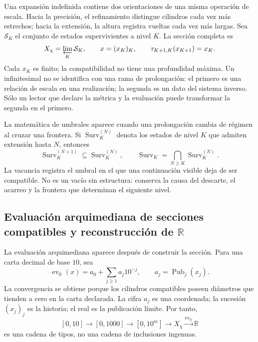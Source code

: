 Una expansión indefinida contiene dos orientaciones de una misma operación
de escala. Hacia la precisión, el refinamiento distingue cilindros cada vez
más estrechos; hacia la extensión, la altura registra vueltas cada vez más
largas. Sea \(\mathcal S_K\) el conjunto de estados supervivientes a nivel
\(K\). La sección completa es
\begin{equation}\label{p12-83-c0-s2:eq:amp-seccion-infinita}
 X_\chi=\varprojlim_K\mathcal S_K,
 \qquad
 x=(x_K)_K,
 \qquad \tau_{K+1,K}(x_{K+1})=x_K.
\end{equation}
Cada \(x_K\) es finito; la compatibilidad no tiene una profundidad máxima.
Un infinitesimal no se identifica con una rama de prolongación: el primero
es una relación de escala en una realización; la segunda es un dato del
sistema inverso. Sólo un lector que declare la métrica y la evaluación puede
transformar la segunda en el primero.

La matemática de umbrales aparece cuando una prolongación cambia de régimen
al cruzar una frontera. Si
\(\operatorname{Surv}_K^{(N)}\) denota los estados de nivel \(K\) que admiten
extensión hasta \(N\), entonces
\begin{equation}\label{p12-83-c0-s2:eq:amp-horizontes-supervivencia}
 \operatorname{Surv}_K^{(N+1)}\subseteq
 \operatorname{Surv}_K^{(N)},
 \qquad
 \operatorname{Surv}_K=\bigcap_{N\geq K}
 \operatorname{Surv}_K^{(N)}.
\end{equation}
La vacancia registra el umbral en el que una continuación visible deja de
ser compatible. No es un vacío sin estructura: conserva la causa del
descarte, el acarreo y la frontera que determinan el siguiente nivel.

\subsection{Evaluación arquimediana de secciones compatibles y reconstrucción de \(\mathbb R\)}

La evaluación arquimediana aparece después de construir la sección. Para
una carta decimal de base \(10\), sea
\begin{equation}\label{p12-83-c0-s2:eq:amp-evaluacion-arquimediana}
 \operatorname{ev}_{\mathbb R}(x)
 =a_0+\sum_{j\geq1}a_j10^{-j},
 \qquad a_j=\operatorname{Pub}_j(x_j).
\end{equation}
La convergencia se obtiene porque los cilindros compatibles poseen diámetros
que tienden a cero en la carta declarada. La cifra \(a_j\) es una coordenada;
la sucesión \((x_j)_j\) es la historia; el real es la publicación límite.
Por tanto,
\begin{equation}\label{p12-83-c0-s2:eq:amp-cadena-recta-R}
 [0,10]\longrightarrow[0,1000]
 \longrightarrow[0,10^m]
 \longrightarrow X_\chi
 \xrightarrow{\operatorname{ev}_{\mathbb R}}\mathbb R
\end{equation}
es una cadena de tipos, no una cadena de inclusiones ingenuas.

